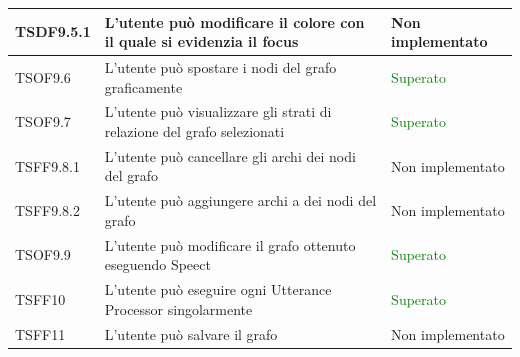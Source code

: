 \documentclass[openany,12pt,a4paper]{report}
\begin{document}
\begin{longtable}[c]{| p{2cm} |p{8cm} | p{2.5cm} |}
	\newline TSDF9.5.1&
	\newline L'utente può modificare il colore con il quale si evidenzia il focus&
	\newline Non implementato
	\\[1em]
	\hline
	
	\newline TSOF9.6&
	\newline L'utente può spostare i nodi del grafo graficamente&
	\newline \textcolor{green}{Superato}
	\\[1em]
	\hline
	
	\newline TSOF9.7&
	\newline L'utente può visualizzare gli strati di relazione del grafo selezionati&
	\newline \textcolor{green}{Superato}
	\\[1em]
	\hline
	
	\newline TSFF9.8.1&
	\newline L'utente può cancellare gli archi dei nodi del grafo&
	\newline Non implementato
	\\[1em]
	\hline
	
	\newline TSFF9.8.2&
	\newline L'utente può aggiungere archi a dei nodi del grafo&
	\newline Non implementato
	\\[1em]
	\hline
	
	\newline TSOF9.9&
	\newline L'utente può modificare il grafo ottenuto eseguendo Speect&
	\newline \textcolor{green}{Superato}
	\\[1em]
	\hline	
	
	\newline TSFF10&
	\newline L'utente può eseguire ogni Utterance Processor singolarmente&
	\newline \textcolor{green}{Superato}
	\\[1em]
	\hline
	
	
	\newline TSFF11&
	\newline L'utente può salvare il grafo&
	\newline Non implementato
	\\[1em]
	\hline
	

\end{longtable}
\end{document}
